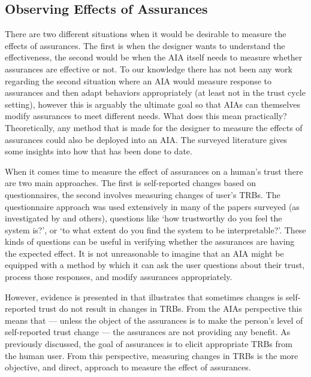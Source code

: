 \subsection{Observing Effects of Assurances} \label{sec:measuring_effects}

    There are two different situations when it would be desirable to measure the effects of assurances. The first is when the designer wants to understand the effectiveness, the second would be when the AIA itself needs to measure whether assurances are effective or not. To our knowledge there has not been any work regarding the second situation where an AIA would measure response to assurances and then adapt behaviors appropriately (at least not in the trust cycle setting), however this is arguably the ultimate goal so that AIAs can themselves modify assurances to meet different needs. What does this mean practically? Theoretically, any method that is made for the designer to measure the effects of assurances could also be deployed into an AIA. The surveyed literature gives some insights into how that has been done to date.
   
    When it comes time to measure the effect of assurances on a human's trust there are two main approaches. The first is self-reported changes based on questionnaires, the second involves measuring changes of user's TRBs. The questionnaire approach was used extensively in many of the papers surveyed (as investigated by \cite{Mcknight2011-gv,Muir1996-gt,Wickens1999-la,Salem2015-md,Kaniarasu2013-ho} and others), questions like `how trustworthy do you feel the system is?', or `to what extent do you find the system to be interpretable?'. These kinds of questions can be useful in verifying whether the assurances are having the expected effect. It is not unreasonable to imagine that an AIA might be equipped with a method by which it can ask the user questions about their trust, process those responses, and modify assurances appropriately.
    
    However, evidence is presented in \cite{Dzindolet2003-ts} that illustrates that sometimes changes is self-reported trust do not result in changes in TRBs. From the AIAs perspective this means that --- unless the object of the assurances is to make the person's level of self-reported trust change --- the assurances are not providing any benefit. As previously discussed, the goal of assurances is to elicit appropriate TRBs from the human user. From this perspective, measuring changes in TRBs is the more objective, and direct, approach to measure the effect of assurances.

